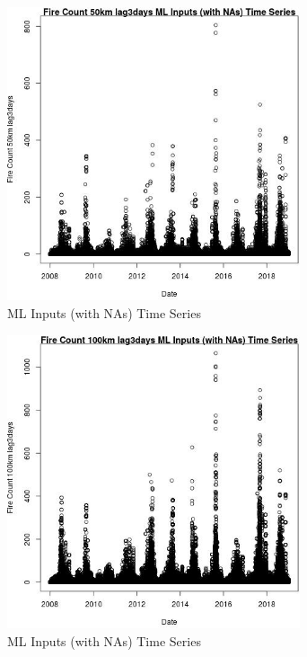 \begin{figure} 
\centering  
\includegraphics[width=0.77\textwidth]{Code_Outputs/Report_ML_input_PM25_Step4_part_f_de_duplicated_aveswNAs_Fire_Count_50km_lag3daysvDate.jpg} 
\caption{\label{fig:Report_ML_input_PM25_Step4_part_f_de_duplicated_aveswNAsFire_Count_50km_lag3daysvDate}ML Inputs (with NAs) Time Series} 
\end{figure} 
 

\begin{figure} 
\centering  
\includegraphics[width=0.77\textwidth]{Code_Outputs/Report_ML_input_PM25_Step4_part_f_de_duplicated_aveswNAs_Fire_Count_100km_lag3daysvDate.jpg} 
\caption{\label{fig:Report_ML_input_PM25_Step4_part_f_de_duplicated_aveswNAsFire_Count_100km_lag3daysvDate}ML Inputs (with NAs) Time Series} 
\end{figure} 
 

